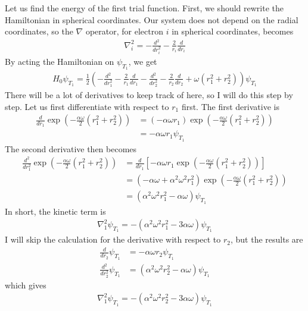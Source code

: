 \documentclass[12pt]{article}
\begin{document}
Let us find the energy of the first trial function. First, we should rewrite the Hamiltonian in spherical coordinates. Our system does not depend on the radial coordinates, so the $\nabla$ operator, for electron $i$ in spherical coordinates, becomes
\begin{align*}
\nabla^2_i = -\frac{d^2}{dr^2_i} - \frac{2}{r_i}\frac{d}{dr_i}
\end{align*}
By acting the Hamiltonian on $\psi_{T_1}$, we get
\begin{align*}
H_0\psi_{T_1} = \frac{1}{2}\left(-\frac{d^2}{dr^2_1} - \frac{2}{r_1}\frac{d}{dr_1} -\frac{d^2}{dr^2_2} - \frac{2}{r_2}\frac{d}{dr_2} + \omega(r_1^2+r_2^2)\right)\psi_{T_1}
\end{align*}
There will be a lot of derivatives to keep track of here, so I will do this step by step. Let us first differentiate with respect to $r_1$ first. The first derivative is
\begin{align*}
\frac{d}{dr_1}\exp\left(-\frac{\alpha \omega}{2}(r^2_1 + r^2_2)\right) &= \left( -\alpha \omega r_1 \right)\exp\left(-\frac{\alpha \omega}{2}(r^2_1 + r^2_2)\right) \\
&= -\alpha \omega r_1 \psi_{T_1}
\end{align*}
The second derivative then becomes
\begin{align*}
\frac{d^2}{dr_1^2}\exp\left(-\frac{\alpha \omega}{2}(r^2_1 + r^2_2)\right) &= \frac{d}{dr_1}\left[-\alpha \omega r_1 \exp\left(-\frac{\alpha \omega}{2}(r^2_1 + r^2_2)\right)\right]\\
&= (-\alpha \omega + \alpha^2 \omega^2 r_1^2)\exp\left(-\frac{\alpha \omega}{2}(r^2_1 + r^2_2)\right) \\
&= (\alpha^2 \omega^2 r_1^2 - \alpha \omega)\psi_{T_1}
\end{align*}
In short, the kinetic term is
\begin{align}
\nabla_1^2 \psi_{T_1} =-(\alpha^2\omega^2r_1^2 -3 \alpha \omega)\psi_{T_1}
\label{eq:Kinetic_psi1}
\end{align}
I will skip the calculation for the derivative with respect to $r_2$, but the results are
\begin{align*}
\frac{d}{dr_2}\psi_{T_1} &=  -\alpha \omega r_2 \psi_{T_1} \\
\frac{d^2}{dr_2^2}\psi_{T_1} &= (\alpha^2 \omega^2 r_2^2 - \alpha \omega)\psi_{T_1}
\end{align*}
which gives
\begin{align*}
\nabla_1^2 \psi_{T_1} =-(\alpha^2\omega^2r_2^2 -3 \alpha \omega)\psi_{T_1}
\end{align*}
\end{document}
